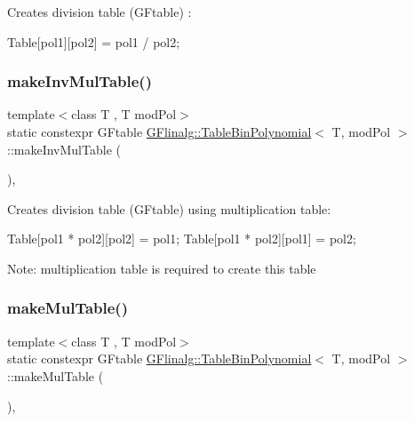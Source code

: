 Creates division table (G\+Ftable) \+: \begin{DoxyVerb}Table[pol1][pol2] = pol1 / pol2;
\end{DoxyVerb}
 \mbox{\label{class_g_flinalg_1_1_table_bin_polynomial_a2a0dbcfb00f001ecb8075dc5848e019d}} 
\subsubsection{\texorpdfstring{makeInvMulTable()}{makeInvMulTable()}}
{\footnotesize\ttfamily template$<$class T , T mod\+Pol$>$ \\
static constexpr G\+Ftable \mbox{\hyperlink{class_g_flinalg_1_1_table_bin_polynomial}{G\+Flinalg\+::\+Table\+Bin\+Polynomial}}$<$ T, mod\+Pol $>$\+::make\+Inv\+Mul\+Table (\begin{DoxyParamCaption}{ }\end{DoxyParamCaption})\hspace{0.3cm}{\ttfamily [inline]}, {\ttfamily [static]}}

Creates division table (G\+Ftable) using multiplication table\+: \begin{DoxyVerb}Table[pol1 * pol2][pol2] = pol1;
Table[pol1 * pol2][pol1] = pol2;
\end{DoxyVerb}


Note\+: multiplication table is required to create this table \mbox{\label{class_g_flinalg_1_1_table_bin_polynomial_aad37419226d193f007877e3bc33fbc2d}} 
\subsubsection{\texorpdfstring{makeMulTable()}{makeMulTable()}}
{\footnotesize\ttfamily template$<$class T , T mod\+Pol$>$ \\
static constexpr G\+Ftable \mbox{\hyperlink{class_g_flinalg_1_1_table_bin_polynomial}{G\+Flinalg\+::\+Table\+Bin\+Polynomial}}$<$ T, mod\+Pol $>$\+::make\+Mul\+Table (\begin{DoxyParamCaption}{ }\end{DoxyParamCaption})\hspace{0.3cm}{\ttfamily [inline]}, {\ttfamily [static]}}

